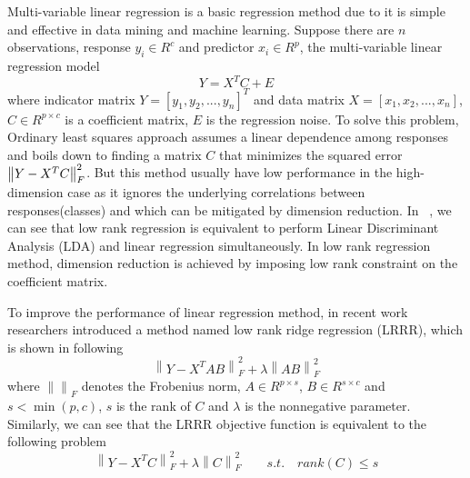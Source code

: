 \documentclass{ieeeaccess}
\begin{document}
Multi-variable linear regression is a basic regression method due to it is simple and effective in data mining and machine learning. Suppose there are $n$ observations, response ${y_i} \in {R^c}$ and predictor ${x_i} \in {R^p}$, the multi-variable linear regression model
\begin{equation}\label{eq01}
Y = {X^T}C  + E
\end{equation}
\noindent where indicator matrix $Y = [{y_1},{y_2},...,{y_n}]^T$ and data matrix $X = [{x_1},{x_2},...,{x_n}]$, $C  \in {R^{p \times c}}$ is a coefficient matrix, $E$ is the regression noise. To solve this problem, Ordinary least squares approach assumes a linear dependence among responses and boils down to finding a matrix $C$ that minimizes the squared error $\left\| {Y - {X^T}C {\rm{ }}} \right\|_F^2$. But this method usually have low performance in the high-dimension case as it ignores the underlying correlations between responses(classes) and which can be mitigated by dimension reduction. In ~\cite{ref11}, we can see that low rank regression is equivalent to perform Linear Discriminant Analysis (LDA) and linear regression simultaneously. In low rank regression method, dimension reduction is achieved by imposing low rank constraint on the coefficient matrix.

To improve the performance of linear regression method, in recent work~\cite{ref11} researchers introduced a method named low rank ridge regression (LRRR), which is shown in following
\begin{equation}\label{eq02}
\left\| {Y - {X^T}AB} \right\|_F^2 + \lambda \left\| {AB} \right\|_F^2
\end{equation}
where ${\left\| {} \right\|_F}$ denotes the Frobenius norm, $A \in {R^{p \times s}}$, $B \in {R^{s \times c}}$ and $s < \min (p,c)$, $s$ is the rank of $C$ and $\lambda$ is the nonnegative parameter. Similarly, we can see that the LRRR objective function is equivalent to the following problem
\begin{equation}\label{eq20}
\left\| {Y - {X^T}C } \right\|_F^2 + \lambda \left\| C  \right\|_F^2 \qquad  s.t. \quad rank(C ) \le s
\end{equation}
\end{document}
